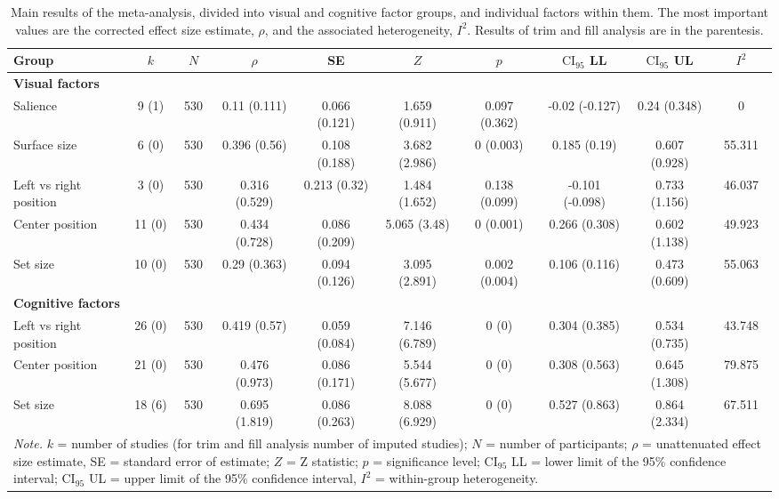 \begin{table}[ht]
\centering
\caption{Main results of the meta-analysis, divided into visual and cognitive factor groups, and individual factors within them. The most important values are the corrected effect size estimate, $\rho$, and the associated heterogeneity, $I^2$. Results of trim and fill analysis are in the parentesis.} 
\label{tab:main_results}
\begin{tabular}{lccccccccc}
  \hline
Group & $k$ & $N$ & $\rho$ & SE & $Z$ & $p$ & $\textrm{CI}_{95}$ LL & $\textrm{CI}_{95}$ UL & $I^2$ \\ 
  \hline
\textbf{Visual factors} &  &  &  &  &  &  &  &  &  \\ 
  Salience & 9 (1) & 530 & 0.11 (0.111) & 0.066 (0.121) & 1.659 (0.911) & 0.097 (0.362) & -0.02 (-0.127) & 0.24 (0.348) & 0 \\ 
  Surface size & 6 (0) & 530 & 0.396 (0.56) & 0.108 (0.188) & 3.682 (2.986) & 0 (0.003) & 0.185 (0.19) & 0.607 (0.928) & 55.311 \\ 
  Left vs right position & 3 (0) & 530 & 0.316 (0.529) & 0.213 (0.32) & 1.484 (1.652) & 0.138 (0.099) & -0.101 (-0.098) & 0.733 (1.156) & 46.037 \\ 
  Center position & 11 (0) & 530 & 0.434 (0.728) & 0.086 (0.209) & 5.065 (3.48) & 0 (0.001) & 0.266 (0.308) & 0.602 (1.138) & 49.923 \\ 
  Set size & 10 (0) & 530 & 0.29 (0.363) & 0.094 (0.126) & 3.095 (2.891) & 0.002 (0.004) & 0.106 (0.116) & 0.473 (0.609) & 55.063 \\ 
  \textbf{Cognitive factors} &  &  &  &  &  &  &  &  &  \\ 
  Left vs right position & 26 (0) & 530 & 0.419 (0.57) & 0.059 (0.084) & 7.146 (6.789) & 0 (0) & 0.304 (0.385) & 0.534 (0.735) & 43.748 \\ 
  Center position & 21 (0) & 530 & 0.476 (0.973) & 0.086 (0.171) & 5.544 (5.677) & 0 (0) & 0.308 (0.563) & 0.645 (1.308) & 79.875 \\ 
  Set size & 18 (6) & 530 & 0.695 (1.819) & 0.086 (0.263) & 8.088 (6.929) & 0 (0) & 0.527 (0.863) & 0.864 (2.334) & 67.511 \\ 
   \hline 
 \multicolumn{10}{p{0.9\textwidth}}{\scriptsize{\textit{Note.} $k$ = number of studies (for trim and fill analysis number of imputed studies); $N$ = number of participants; $\rho$ = unattenuated effect size estimate, SE = standard error of estimate; $Z$ = Z statistic; $p$ = significance level; $\textrm{CI}_{95}$ LL = lower limit of the 95\% confidence interval; $\textrm{CI}_{95}$ UL = upper limit of the 95\% confidence interval, $I^2$ = within-group heterogeneity.}} 
\end{tabular}
\end{table}
